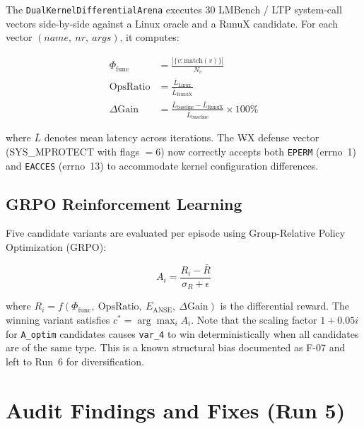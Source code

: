 \documentclass[10pt,twocolumn]{article}
\begin{document}
The \texttt{DualKernelDifferentialArena} executes 30 LMBench / LTP system-call vectors
side-by-side against a Linux oracle and a RunuX candidate. For each vector
$(name,\ nr,\ args)$, it computes:

\begin{align}
  \Phi_{\text{func}} &= \frac{|\{v : \text{match}(v)\}|}{N_v} \\
  \text{OpsRatio} &= \frac{\bar{L}_{\text{Linux}}}{\bar{L}_{\text{RunuX}}} \\
  \Delta\text{Gain} &= \frac{\bar{L}_{\text{baseline}} - \bar{L}_{\text{RunuX}}}
                          {\bar{L}_{\text{baseline}}} \times 100\%
\end{align}

where $\bar{L}$ denotes mean latency across iterations.
The W$\hat{}$X defense vector (SYS\_MPROTECT with flags $=6$) now correctly
accepts both \texttt{EPERM} (errno~1) and \texttt{EACCES} (errno~13) to
accommodate kernel configuration differences.

\subsection{GRPO Reinforcement Learning}

Five candidate variants are evaluated per episode using Group-Relative Policy Optimization (GRPO):

\begin{equation}
  A_i = \frac{R_i - \bar{R}}{\sigma_R + \epsilon}
\end{equation}

where $R_i = f(\Phi_{\text{func}},\ \text{OpsRatio},\ E_{\text{ANSE}},\ \Delta\text{Gain})$
is the differential reward. The winning variant satisfies
$c^* = \arg\max_i A_i$.
Note that the scaling factor $1 + 0.05i$ for \texttt{A\_optim} candidates causes
\texttt{var\_4} to win deterministically when all candidates are of the same type.
This is a known structural bias documented as F-07 and left to Run~6 for diversification.

\section{Audit Findings and Fixes (Run 5)}
\end{document}
